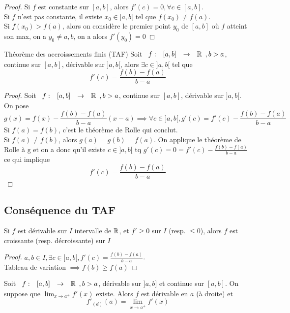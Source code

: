 \documentclass[]{report}
\begin{document}
\begin{proof}
    Si $f$ est constante sur $[a,b]$, alors $f'(c)=0,\forall c\in [a,b]$.\\
    Si $f$ n'est pas constante, il existe $x_0\in ]a,b[$ tel que $f(x_0)\neq f(a)$.\\
    Si $f(x_0)>f(a)$, alors on considère le premier point $y_0$ de $[a,b]$ où $f$ atteint son max, on a $y_0\neq a,b$, on a alors $f'(y_0)=0$
\end{proof}

\begin{tm}{Théorème des accroissements finis (TAF)}{}
    Soit $\begin{array}{ccccc} f : & [a,b] & \to & \mathbb{R} \end{array},b>a$, continue sur $[a,b]$, dérivable sur $]a,b[$, alors $\exists c\in ]a,b[$ tel que 
    \[f'(c)=\frac{f(b)-f(a)}{b-a}\]
\end{tm}

\begin{proof}
    Soit $\begin{array}{ccccc} f : & [a,b] & \to & \mathbb{R} \end{array},b>a$, continue sur $[a,b]$, dérivable sur $]a,b[$. On pose
    \[g(x)=f(x) - \frac{f(b)-f(a)}{b-a}(x-a)\implies \forall c\in ]a,b[, g'(c)=f'(c)-\frac{f(b)-f(a)}{b-a}\]
    Si $f(a)=f(b)$, c'est le théorème de Rolle qui conclut.\\
    Si $f(a)\neq f(b)$, alors $g(a)= g(b) = f(a)$. On applique le théorème de Rolle à g et on a donc qu'il existe $c\in ]a,b[$ tq $g'(c)=0=f'(c)-\frac{f(b)-f(a)}{b-a}$ ce qui implique
    \[f'(c)=\frac{f(b)-f(a)}{b-a}\]
\end{proof}

\subsection*{Conséquence du TAF}

\begin{prop}{}{}
    Si $f$ est dérivable sur $I$ intervalle de $\mathbb{R}$, et $f'\ge 0$ sur $I$ (resp. $\le 0$), alors $f$ est croissante (resp. décroissante) sur $I$ 
\end{prop}

\begin{proof}
    $a,b\in I,\exists c\in ]a,b[, f'(c)=\frac{f(b)-f(a)}{b-a}$.\\
    Tableau de variation $\implies f(b)\ge f(a)$
\end{proof}

\begin{prop}{}{}
    Soit $\begin{array}{ccccc} f : & [a,b] & \to & \mathbb{R} \end{array}, b>a$, dérivable sur $]a,b]$ et continue sur $[a,b]$. On suppose que $\lim_{x\to a^+}f'(x)$ existe. Alors $f$ est dérivable en $a$ (à droite) et
    \[f'_{(d)}(a)=\lim_{x\to a^+} f'(x)\]
\end{prop}
\end{document}

